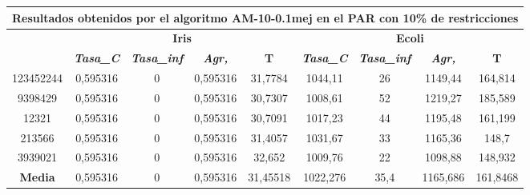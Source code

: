 \documentclass[12pt, spanish]{article}
\begin{document}
\begin{table}[H]
\footnotesize
\begin{tabular}{|c|c|c|c|c|c|c|c|c|}
\hline
\multicolumn{9}{|c|}{\textbf{Resultados obtenidos por el algoritmo AM-10-0.1mej en el PAR con 10\% de restricciones}}                                                                                             \\ \hline
\multirow{2}{*}{} & \multicolumn{4}{c|}{\textbf{Iris}}                                                            & \multicolumn{4}{c|}{\textbf{Ecoli}}                                                           \\ \cline{2-9} 
                  & \textit{\textbf{Tasa\_C}} & \textit{\textbf{Tasa\_inf}} & \textit{\textbf{Agr,}} & \textbf{T} & \textit{\textbf{Tasa\_C}} & \textit{\textbf{Tasa\_inf}} & \textit{\textbf{Agr,}} & \textbf{T} \\ \hline
123452244         & 0,595316                  & 0                           & 0,595316               & 31,7784    & 1044,11                   & 26                          & 1149,44                & 164,814    \\ \hline
9398429           & 0,595316                  & 0                           & 0,595316               & 30,7307    & 1008,61                   & 52                          & 1219,27                & 185,589    \\ \hline
12321             & 0,595316                  & 0                           & 0,595316               & 30,7091    & 1017,23                   & 44                          & 1195,48                & 161,199    \\ \hline
213566            & 0,595316                  & 0                           & 0,595316               & 31,4057    & 1031,67                   & 33                          & 1165,36                & 148,7      \\ \hline
3939021           & 0,595316                  & 0                           & 0,595316               & 32,652     & 1009,76                   & 22                          & 1098,88                & 148,932    \\ \hline
\textbf{Media}    & 0,595316                  & 0                           & 0,595316               & 31,45518   & 1022,276                  & 35,4                        & 1165,686               & 161,8468   \\ \hline
\end{tabular}
\end{table}
\end{document}
